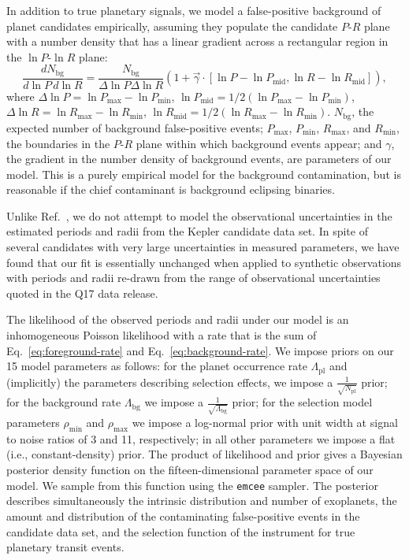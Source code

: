 \documentclass{nature}
\newcommand{\Rpl}{\Lambda_\mathrm{pl}}
\newcommand{\Npl}{N_\mathrm{pl}}
\newcommand{\Rbg}{\Lambda_\mathrm{bg}}
\newcommand{\Nbg}{N_\mathrm{bg}}
\newcommand{\rhomin}{\rho_\mathrm{min}}
\newcommand{\rhomax}{\rho_\mathrm{max}}
\begin{document}
In addition to true planetary signals, we model a false-positive
background of planet candidates empirically, assuming they populate
the candidate $P$-$R$ plane with a number density that has a linear
gradient across a rectangular region in the $\ln P$-$\ln R$ plane:
\begin{equation}
  \label{eq:background-rate}
  \frac{d\Nbg}{d \ln P \, d \ln R} = \frac{\Nbg}{\Delta \ln P \Delta
    \ln R} \left( 1 + \vec{\gamma} \cdot \left[ \ln P - \ln P_\mathrm{mid} , \ln
    R - \ln R_\mathrm{mid} \right] \right),
\end{equation}
where $\Delta \ln P = \ln P_\mathrm{max} - \ln P_\mathrm{min}$, $\ln
P_\mathrm{mid} = 1/2\left(\ln P_\mathrm{max} - \ln P_\mathrm{min}
\right)$, $\Delta \ln R = \ln R_\mathrm{max} - \ln R_\mathrm{min}$,
$\ln R_\mathrm{mid} = 1/2\left(\ln R_\mathrm{max} - \ln R_\mathrm{min}
\right)$.  $\Nbg$, the expected number of background false-positive
events; $P_\mathrm{max}$, $P_\mathrm{min}$, $R_\mathrm{max}$, and
$R_\mathrm{min}$, the boundaries in the $P$-$R$ plane within which
background events appear; and $\gamma$, the gradient in the number
density of background events, are parameters of our model.  This is a
purely empirical model for the background contamination, but is
reasonable if the chief contaminant is background eclipsing
binaries\cite{Fressin2013,Duquennoy1991}.

Unlike Ref.\ \cite{Foreman-Mackey2014}, we do not attempt to model the
observational uncertainties in the estimated periods and radii from
the Kepler candidate data set.  In spite of several candidates with
very large uncertainties in measured parameters, we have found that our
fit is essentially unchanged when applied to synthetic observations
with periods and radii re-drawn from the range of observational
uncertainties quoted in the Q17 data release.  

The likelihood of the observed periods and radii under our model is an
inhomogeneous Poisson likelihood\cite{Farr2013,Youdin2011} with a rate
that is the sum of Eq.\ \eqref{eq:foreground-rate} and
Eq.\ \eqref{eq:background-rate}.  We impose priors on our 15 model
parameters as follows: for the planet occurrence rate $\Rpl$ and
(implicitly) the parameters describing selection effects, we impose a
$\frac{1}{\sqrt{\Npl}}$ prior; for the background rate $\Rbg$ we
impose a $\frac{1}{\sqrt{\Rbg}}$ prior; for the selection model
parameters $\rhomin$ and $\rhomax$ we impose a log-normal prior with
unit width at signal to noise ratios  of 3 and 11, respectively; in all other parameters
we impose a flat (i.e., constant-density) prior.  The product of
likelihood and prior gives a Bayesian posterior density function on
the fifteen-dimensional parameter space of our model.  We sample from
this function using the \texttt{emcee}
sampler\cite{Foreman-Mackey2013}.  The posterior describes
simultaneously the intrinsic distribution and number of exoplanets,
the amount and distribution of the contaminating false-positive events
in the candidate data set, and the selection function of the
instrument for true planetary transit events.
\end{document}
